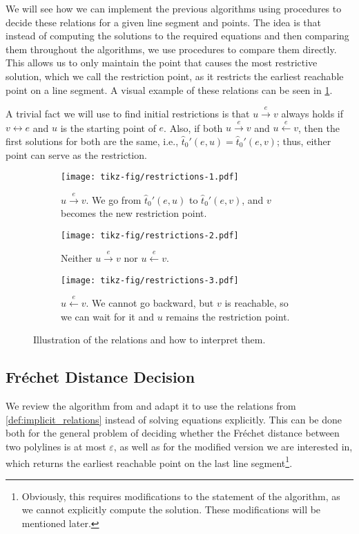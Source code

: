 We will see how we can implement the previous algorithms using procedures to decide these relations for a given line segment and points. The idea is that instead of computing the solutions to the required equations and then comparing them throughout the algorithms, we use procedures to compare them directly. This allows us to only maintain the point that causes the most restrictive solution, which we call the restriction point, as it restricts the earliest reachable point on a line segment. A visual example of these relations can be seen in \cref{fig:restrictions}.

A trivial fact we will use to find initial restrictions is that \(u \overset e\rightarrow v\) always holds if \(v \leftrightarrow e\) and \(u\) is the starting point of \(e\). Also, if both \(u \overset e\rightarrow v\) and \(u \overset e\leftarrow v\), then the first solutions for both are the same, i.e., \(\hat t_0'(e, u) = \hat t_0'(e,v)\); thus, either point can serve as the restriction.

\begin{figure}[ht]
  \centering
  \begin{subfigure}[t]{0.3\textwidth}
    \texttt{[image: tikz-fig/restrictions-1.pdf]}
    \caption{\(u \overset e\rightarrow v\). We go from \(\hat t_0'(e, u)\) to \(\hat t_0'(e, v)\), and \(v\) becomes the new restriction point.}
  \end{subfigure}
  \begin{subfigure}[t]{0.3\textwidth}
    \texttt{[image: tikz-fig/restrictions-2.pdf]}
    \caption{Neither \(u \overset e\rightarrow v\) nor \(u \overset e\leftarrow v\).}
  \end{subfigure}
  \begin{subfigure}[t]{0.3\textwidth}
    \texttt{[image: tikz-fig/restrictions-3.pdf]}
    \caption{\(u \overset e\leftarrow v\). We cannot go backward, but \(v\) is reachable, so we can wait for it and \(u\) remains the restriction point.}
  \end{subfigure}
  \caption{Illustration of the relations and how to interpret them.}
  \label{fig:restrictions}
\end{figure}

\subsection{Fréchet Distance Decision}
We review the algorithm from \citeauthor{computing_the_frechet_distance_between_two_polygonal_curves} and adapt it to use the relations from \cref{def:implicit_relations} instead of solving equations explicitly. This can be done both for the general problem of deciding whether the Fréchet distance between two polylines is at most \(\varepsilon\), as well as for the modified version we are interested in, which returns the earliest reachable point on the last line segment\footnote{Obviously, this requires modifications to the statement of the algorithm, as we cannot explicitly compute the solution. These modifications will be mentioned later.}.

